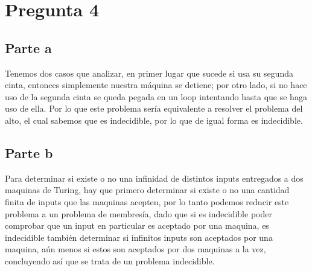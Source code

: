 \documentclass[11pt,letterpaper]{article}
\begin{document}
\section{Pregunta 4}
\subsection{Parte a}
Tenemos dos casos que analizar, en primer lugar que sucede si usa su segunda cinta, entonces simplemente nuestra máquina se detiene; por otro lado, si no hace uso de la segunda cinta se queda pegada en un loop intentando hasta que se haga uso de ella.
Por lo que este problema sería equivalente a resolver el problema del alto, el cual sabemos que es indecidible, por lo que de igual forma es indecidible.

\subsection{Parte b}
Para determinar si existe o no una infinidad de distintos inputs entregados a dos maquinas de Turing, hay que primero determinar si existe o no una cantidad finita de inputs que las maquinas acepten, por lo tanto podemos reducir este problema a un problema de membresía, dado que si es indecidible poder comprobar que un input en particular es aceptado por una maquina, es indecidible también determinar si infinitos inputs son aceptados por una maquina, aún menos si estos son aceptados por dos maquinas a la vez, concluyendo así que se trata de un problema indecidible.
\end{document}
